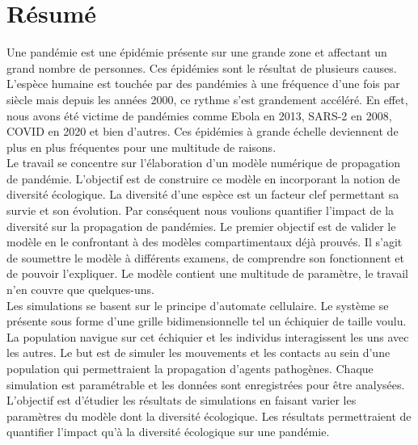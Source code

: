 \chapter{Résumé} \label{ch:resume}

Une pandémie est une épidémie présente sur une grande zone et affectant un grand nombre de personnes. Ces épidémies sont le résultat de plusieurs causes. L'espèce humaine est touchée par des pandémies à une fréquence d'une fois par siècle mais depuis les années 2000, ce rythme s'est grandement accéléré. En effet, nous avons été victime de pandémies comme Ebola en 2013, SARS-2 en 2008, COVID en 2020 et bien d'autres. Ces épidémies à grande échelle deviennent de plus en plus fréquentes pour une multitude de raisons.\\

Le travail se concentre sur l'élaboration d'un modèle numérique de propagation de pandémie. L'objectif est de construire ce modèle en incorporant la notion de diversité écologique. La diversité d'une espèce est un facteur clef permettant sa survie et son évolution. Par conséquent nous voulions quantifier l'impact de la diversité sur la propagation de pandémies. Le premier objectif est de valider le modèle en le confrontant à des modèles compartimentaux déjà prouvés. Il s'agit de soumettre le modèle à différents examens, de comprendre son fonctionnent et de pouvoir l'expliquer. Le modèle contient une multitude de paramètre, le travail n'en couvre que quelques-uns.\\

Les simulations se basent sur le principe d'automate cellulaire. Le système se présente sous forme d'une grille bidimensionnelle tel un échiquier de taille voulu. La population navigue sur cet échiquier et les individus interagissent les uns avec les autres. Le but est de simuler les mouvements et les contacts au sein d'une population qui permettraient la propagation d'agents pathogènes. Chaque simulation est paramétrable et les données sont enregistrées pour être analysées.\\

L'objectif est d'étudier les résultats de simulations en faisant varier les paramètres du modèle dont la diversité écologique. Les résultats permettraient de quantifier l'impact qu'à la diversité écologique sur une pandémie.